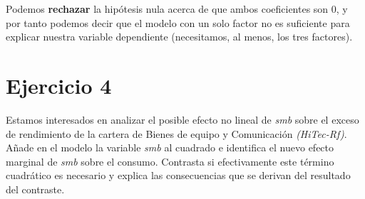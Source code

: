 \documentclass[12pt]{article}
\numberwithin{equation}{section} %
\begin{document}
Podemos \textbf{rechazar} la hipótesis nula acerca de que ambos coeficientes son 0, y por tanto podemos decir que el modelo con un solo factor no es suficiente para explicar nuestra variable dependiente (necesitamos, al menos, los tres factores).

\section{Ejercicio 4} Estamos interesados en analizar el posible efecto no lineal de \textit{smb} sobre el exceso de rendimiento de la cartera de Bienes de equipo y Comunicación \textit{(HiTec-Rf)}. Añade en el modelo la variable \textit{smb} al cuadrado e identifica el nuevo efecto marginal de \textit{smb} sobre el consumo. Contrasta si efectivamente este término cuadrático es necesario y explica las consecuencias que se derivan del resultado del contraste.
\end{document}
